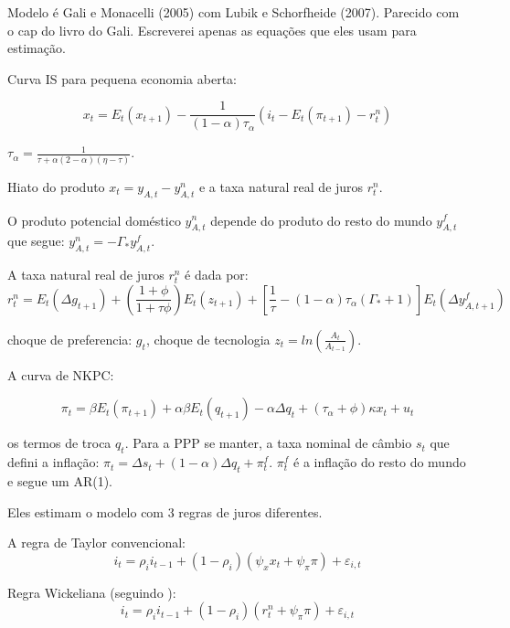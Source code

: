 Modelo é Gali e Monacelli (2005) com Lubik e Schorfheide (2007). Parecido com o cap do livro do Gali. Escreverei apenas as equações que eles usam para estimação.

Curva IS para pequena economia aberta:

\begin{equation*}
    x_t = E_t(x_{t+1}) - \frac{1}{(1-\alpha)\tau_{\alpha}}\left(i_t - E_t(\pi_{t+1}) - r_t^{n} \right)
\end{equation*}

$\tau_{\alpha} = \frac{1}{\tau + \alpha(2 - \alpha)(\eta - \tau)}$.

Hiato do produto $x_t = y_{A,t} - y_{A,t}^{n}$ e a taxa natural real de juros $r_t^{n}$.

O produto potencial doméstico $y_{A,t}^{n}$ depende do produto do resto do mundo $y_{A,t}^{f}$ que segue: $y_{A,t}^{n} = - \Gamma_{*}y_{A,t}^{f} $.

A taxa natural real de juros $r_t^{n}$ é dada por:
\begin{equation*}
    r_t^{n} = E_t(\Delta g_{t+1}) + \left( \frac{1 + \phi}{1 + \tau \phi} \right)E_t(z_{t+1}) + \left[\frac{1}{\tau} -(1 - \alpha)\tau_{\alpha}(\Gamma_{*}+1)   \right]E_t(\Delta y_{A,t+1}^{f})
\end{equation*}

choque de preferencia: $g_t$, choque de tecnologia $z_t = ln\left( \frac{A_t}{A_{t-1}} \right)$.

A curva de NKPC:

\begin{equation*}
    \pi_t = \beta E_t(\pi_{t+1} ) + \alpha \beta E_t(q_{t+1}) - \alpha \Delta q_t + (\tau_{\alpha} + \phi) \kappa x_t + u_t
\end{equation*}

os termos de troca $q_t$. Para a PPP se manter, a taxa nominal de câmbio $s_t$ que defini a inflação: $\pi_t = \Delta s_t + (1 - \alpha) \Delta q_t + \pi_t^{f} $. $\pi_t^{f}$ é a inflação do resto do mundo e segue um AR(1). 

Eles estimam o modelo com 3 regras de juros diferentes.

A regra de Taylor convencional:
\begin{equation*}
    i_t = \rho_i i_{t-1} + (1 - \rho_i)(\psi_{x}x_t + \psi_{\pi} \pi) + \varepsilon_{i,t}
\end{equation*}

Regra Wickeliana (seguindo \citet{Curdia:2015}):
\begin{equation*}
    i_t = \rho_i i_{t-1} + (1 - \rho_i)(r_t^{n} + \psi_{\pi} \pi) + \varepsilon_{i,t}
\end{equation*}

